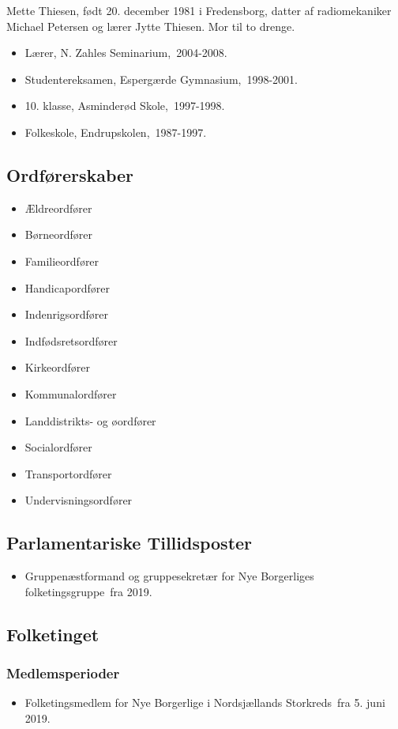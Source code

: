 \documentclass[11pt, a4paper]{awesome-cv}
\begin{document}
\makecvheader[R]
\makelettertitle
\begin{cvletter}
Mette Thiesen, født 20. december 1981 i Fredensborg, datter af radiomekaniker Michael Petersen og lærer Jytte Thiesen. Mor til to drenge.

\begin{itemize}
\item Lærer, N. Zahles Seminarium, 2004-2008.
\item Studentereksamen, Espergærde Gymnasium, 1998-2001.
\item 10. klasse, Asminderød Skole, 1997-1998.
\item Folkeskole, Endrupskolen, 1987-1997.
\end{itemize}
\subsection*{Ordførerskaber}
\begin{itemize}
\item Ældreordfører
\item Børneordfører
\item Familieordfører
\item Handicapordfører
\item Indenrigsordfører
\item Indfødsretsordfører
\item Kirkeordfører
\item Kommunalordfører
\item Landdistrikts- og øordfører
\item Socialordfører
\item Transportordfører
\item Undervisningsordfører
\end{itemize}
\subsection*{Parlamentariske Tillidsposter}
\begin{itemize}
\item Gruppenæstformand og gruppesekretær for Nye Borgerliges folketingsgruppe fra 2019.
\end{itemize}
\subsection*{Folketinget}
\subsubsection*{Medlemsperioder}
\begin{itemize}
\item Folketingsmedlem for Nye Borgerlige i Nordsjællands Storkreds fra 5. juni 2019.
\end{itemize}

\end{cvletter}
\end{document}
